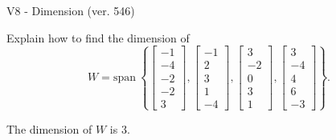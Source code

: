 \begin{exercise}
  \begin{exerciseTitle}V8 - Dimension (ver. 546)\end{exerciseTitle}
  \begin{exerciseStatement}
    Explain how to find the dimension of 
\[W=\mathrm{span}\ \left\{\left[\begin{array}{r}
-1 \\
-4 \\
-2 \\
-2 \\
3
\end{array}\right] , \left[\begin{array}{r}
-1 \\
2 \\
3 \\
1 \\
-4
\end{array}\right] , \left[\begin{array}{r}
3 \\
-2 \\
0 \\
3 \\
1
\end{array}\right] , \left[\begin{array}{r}
3 \\
-4 \\
4 \\
6 \\
-3
\end{array}\right]\right\}.\]



  \end{exerciseStatement}
  \begin{exerciseAnswer}
   The dimension of \(W\) is  \(3\).
  


  \end{exerciseAnswer}
\end{exercise}
